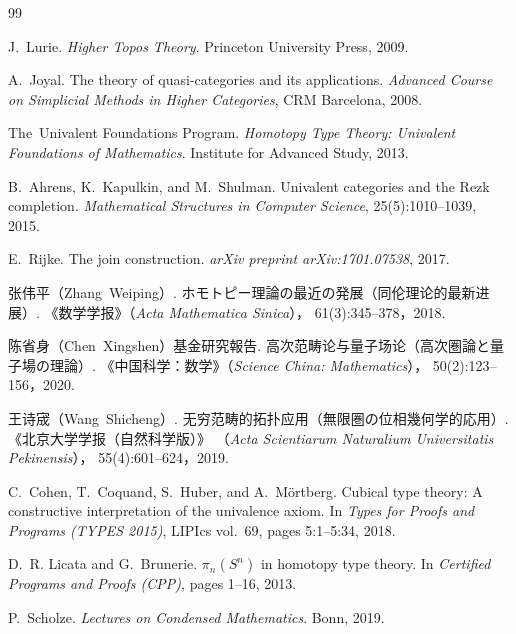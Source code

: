 \documentclass[12pt,a4paper]{article}
\theoremstyle{definition}
\begin{document}
\begin{thebibliography}{99}

J.~Lurie.
\newblock \textit{Higher Topos Theory}.
\newblock Princeton University Press, 2009.

A.~Joyal.
\newblock The theory of quasi-categories and its applications.
\newblock \textit{Advanced Course on Simplicial Methods in Higher Categories},
  CRM Barcelona, 2008.

The~Univalent Foundations Program.
\newblock \textit{Homotopy Type Theory: Univalent Foundations of Mathematics}.
\newblock Institute for Advanced Study, 2013.

B.~Ahrens, K.~Kapulkin, and M.~Shulman.
\newblock Univalent categories and the Rezk completion.
\newblock \textit{Mathematical Structures in Computer Science},
  25(5):1010--1039, 2015.

E.~Rijke.
\newblock The join construction.
\newblock \textit{arXiv preprint arXiv:1701.07538}, 2017.

张伟平（Zhang~Weiping）.
\newblock ホモトピー理論の最近の発展（同伦理论的最新进展）.
\newblock 《数学学报》（\textit{Acta Mathematica Sinica}），
  61(3):345--378，2018.

陈省身（Chen~Xingshen）基金研究報告.
\newblock 高次范畴论与量子场论（高次圏論と量子場の理論）.
\newblock 《中国科学：数学》（\textit{Science China: Mathematics}），
  50(2):123--156，2020.

王诗宬（Wang~Shicheng）.
\newblock 无穷范畴的拓扑应用（無限圏の位相幾何学的応用）.
\newblock 《北京大学学报（自然科学版）》
  （\textit{Acta Scientiarum Naturalium Universitatis Pekinensis}），
  55(4):601--624，2019.

C.~Cohen, T.~Coquand, S.~Huber, and A.~M\"ortberg.
\newblock Cubical type theory: A constructive interpretation of the
  univalence axiom.
\newblock In \textit{Types for Proofs and Programs (TYPES 2015)},
  LIPIcs vol.~69, pages 5:1--5:34, 2018.

D.~R. Licata and G.~Brunerie.
\newblock $\pi_n(S^n)$ in homotopy type theory.
\newblock In \textit{Certified Programs and Proofs (CPP)},
  pages 1--16, 2013.

P.~Scholze.
\newblock \textit{Lectures on Condensed Mathematics}.
\newblock Bonn, 2019.

\end{thebibliography}
\end{document}
